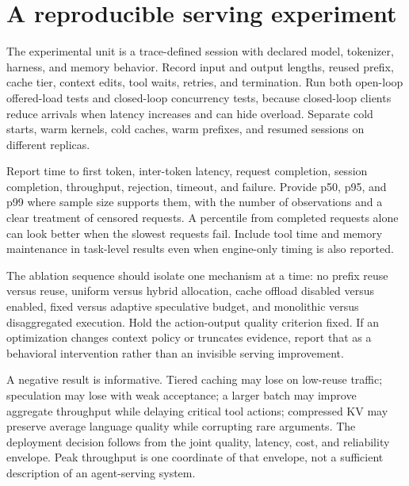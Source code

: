 \section{A reproducible serving experiment}\label{sec:C31:08}
The experimental unit is a trace-defined session with declared model, tokenizer, harness, and memory behavior. Record input and output lengths, reused prefix, cache tier, context edits, tool waits, retries, and termination. Run both open-loop offered-load tests and closed-loop concurrency tests, because closed-loop clients reduce arrivals when latency increases and can hide overload. Separate cold starts, warm kernels, cold caches, warm prefixes, and resumed sessions on different replicas.

Report time to first token, inter-token latency, request completion, session completion, throughput, rejection, timeout, and failure. Provide p50, p95, and p99 where sample size supports them, with the number of observations and a clear treatment of censored requests. A percentile from completed requests alone can look better when the slowest requests fail. Include tool time and memory maintenance in task-level results even when engine-only timing is also reported.

The ablation sequence should isolate one mechanism at a time: no prefix reuse versus reuse, uniform versus hybrid allocation, cache offload disabled versus enabled, fixed versus adaptive speculative budget, and monolithic versus disaggregated execution. Hold the action-output quality criterion fixed. If an optimization changes context policy or truncates evidence, report that as a behavioral intervention rather than an invisible serving improvement.

A negative result is informative. Tiered caching may lose on low-reuse traffic; speculation may lose with weak acceptance; a larger batch may improve aggregate throughput while delaying critical tool actions; compressed KV may preserve average language quality while corrupting rare arguments. The deployment decision follows from the joint quality, latency, cost, and reliability envelope. Peak throughput is one coordinate of that envelope, not a sufficient description of an agent-serving system.
